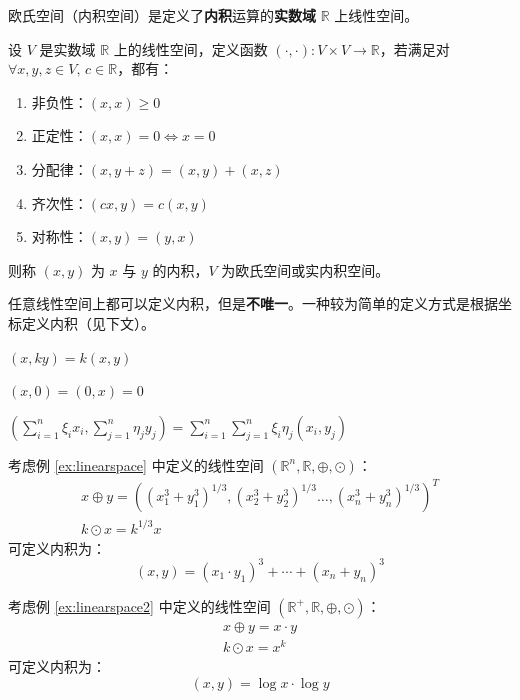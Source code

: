 \noindent 欧氏空间（内积空间）是定义了\textbf{内积}运算的\textbf{实数域} $\mathbb R$ 上线性空间。

\begin{definition}[内积，欧式空间]
设 $V$ 是实数域 $\mathbb R$ 上的线性空间，定义函数 $(\cdot,\cdot):V\times V\to\mathbb R$，若满足对 $\forall x,y,z\in V,\,c\in\mathbb R$，都有：
\begin{enumerate}
    \item 非负性：$(x,x)\geq 0$
    \item 正定性：$(x,x)=0\iff x=0$
    \item 分配律：$(x,y+z)=(x,y)+(x,z)$
    \item 齐次性：$(cx,y)=c(x,y)$
    \item 对称性：$(x,y)=(y,x)$
\end{enumerate}
则称 $(x,y)$ 为 $x$ 与 $y$ 的内积，$V$ 为欧氏空间或实内积空间。
\end{definition}

\begin{remark}
任意线性空间上都可以定义内积，但是\textbf{不唯一}。一种较为简单的定义方式是根据坐标定义内积（见下文）。
\end{remark}

\begin{property}
$(x,ky)=k(x,y)$
\end{property}
\begin{property}
$(x,0)=(0,x)=0$
\end{property}
\begin{property}[线性性]
$\left(\sum_{i=1}^n\xi_ix_i,\sum_{j=1}^n\eta_jy_j\right)=\sum_{i=1}^n\sum_{j=1}^n\xi_i\eta_j(x_i,y_j)$
\end{property}

\begin{example}
考虑例 \ref{ex:linearspace} 中定义的线性空间 $(\mathbb R^n,\mathbb R,\oplus,\odot)$：
\begin{gather*}
    x\oplus y=((x_1^3+y_1^3)^{1/3},(x_2^3+y_2^3)^{1/3}\ldots,(x_n^3+y_n^3)^{1/3})^T\\
    k\odot x=k^{1/3}x
\end{gather*}
可定义内积为：
\[
    (x,y)=(x_1\cdot y_1)^3+\cdots+(x_n+y_n)^3
\]
\end{example}

\begin{example}
\label{ex:innerproduct}
考虑例 \ref{ex:linearspace2} 中定义的线性空间 $(\mathbb R^+,\mathbb R,\oplus,\odot)$：
\begin{gather*}
    x\oplus y=x\cdot y\\
    k\odot x=x^k
\end{gather*}
可定义内积为：
\[
    (x,y)=\log x\cdot \log y
\]
\end{example}

